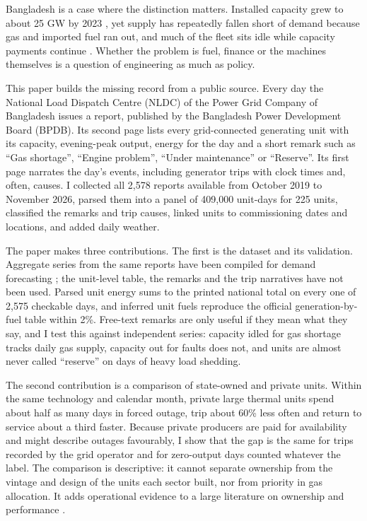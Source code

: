 \documentclass[11pt]{article}
\begin{document}
Bangladesh is a case where the distinction matters. Installed capacity grew to about 25 GW by 2023 \citep{bpdb2023annual}, yet supply has repeatedly fallen short of demand because gas and imported fuel ran out, and much of the fleet sits idle while capacity payments continue \citep{ieefa2024fixing}. Whether the problem is fuel, finance or the machines themselves is a question of engineering as much as policy.

This paper builds the missing record from a public source. Every day the National Load Dispatch Centre (NLDC) of the Power Grid Company of Bangladesh issues a report, published by the Bangladesh Power Development Board (BPDB). Its second page lists every grid-connected generating unit with its capacity, evening-peak output, energy for the day and a short remark such as ``Gas shortage'', ``Engine problem'', ``Under maintenance'' or ``Reserve''. Its first page narrates the day's events, including generator trips with clock times and, often, causes. I collected all 2,578 reports available from October 2019 to November 2026, parsed them into a panel of 409,000 unit-days for 225 units, classified the remarks and trip causes, linked units to commissioning dates and locations, and added daily weather.

The paper makes three contributions. The first is the dataset and its validation. Aggregate series from the same reports have been compiled for demand forecasting \citep{hossain2025dataset}; the unit-level table, the remarks and the trip narratives have not been used. Parsed unit energy sums to the printed national total on every one of 2,575 checkable days, and inferred unit fuels reproduce the official generation-by-fuel table within 2\%. Free-text remarks are only useful if they mean what they say, and I test this against independent series: capacity idled for gas shortage tracks daily gas supply, capacity out for faults does not, and units are almost never called ``reserve'' on days of heavy load shedding.

The second contribution is a comparison of state-owned and private units. Within the same technology and calendar month, private large thermal units spend about half as many days in forced outage, trip about 60\% less often and return to service about a third faster. Because private producers are paid for availability and might describe outages favourably, I show that the gap is the same for trips recorded by the grid operator and for zero-output days counted whatever the label. The comparison is descriptive: it cannot separate ownership from the vintage and design of the units each sector built, nor from priority in gas allocation. It adds operational evidence to a large literature on ownership and performance \citep{megginson2001state}.
\end{document}
